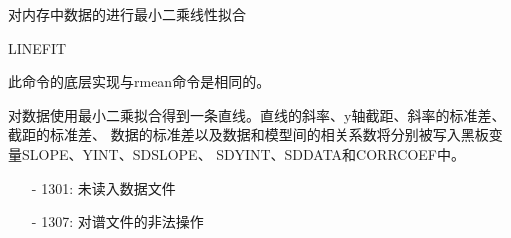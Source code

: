 \label{cmd:linefit}

对内存中数据的进行最小二乘线性拟合

\begin{SACSTX}
LINEFIT
\end{SACSTX}

此命令的底层实现与rmean命令是相同的。

对数据使用最小二乘拟合得到一条直线。直线的斜率、y轴截距、斜率的标准差、截距的标准差、
数据的标准差以及数据和模型间的相关系数将分别被写入黑板变量SLOPE、YINT、SDSLOPE、
SDYINT、SDDATA和CORRCOEF中。

\begin{itemize}
\item[-]1301: 未读入数据文件
\item[-]1307: 对谱文件的非法操作
\end{itemize}
